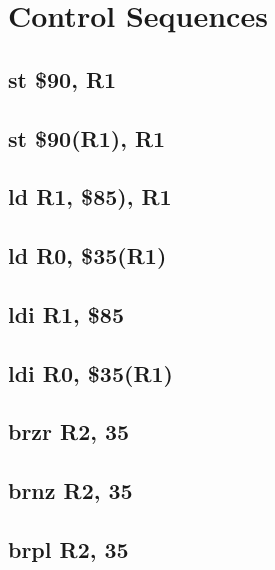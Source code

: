 \documentclass{article}
\begin{document}
\section{Control Sequences}
    \subsection{st \$90, R1} \label{st_case_1_sequence}
        
    \subsection{st \$90(R1), R1} \label{st_case_2_sequence}
        
    \subsection{ld R1, \$85), R1} \label{ld_case_1_sequence}
        
    \subsection{ld R0, \$35(R1)} \label{ld_case_2_sequence}
        
    \subsection{ldi R1, \$85} \label{ldi_case_3_sequence}
        
    \subsection{ldi R0, \$35(R1)} \label{ldi_case_4_sequence}
        
    \subsection{brzr R2, 35} \label{brzr_sequence}
        
    \subsection{brnz R2, 35} \label{brnz_sequence}
        
    \subsection{brpl R2, 35} \label{brpl_sequence}
        
\end{document}
